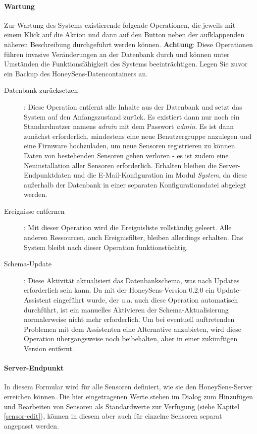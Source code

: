 \documentclass[12pt]{article}
\begin{document}
\paragraph{Wartung}
Zur Wartung des Systems existierende folgende Operationen, die jeweils mit einem Klick auf die Aktion und dann auf den Button neben der aufklappenden näheren Beschreibung durchgeführt werden können. \textbf{Achtung}: Diese Operationen führen invasive Veränderungen an der Datenbank durch und können unter Umständen die Funktionsfähigkeit des Systems beeinträchtigen. Legen Sie zuvor ein Backup des HoneySens-Datencontainers an.

\begin{description}
				\item[Datenbank zurücksetzen]: Diese Operation entfernt alle Inhalte aus der Datenbank und setzt das System auf den Anfangszustand zurück. Es existiert dann nur noch ein Standardnutzer namens \textit{admin} mit dem Passwort \textit{admin}. Es ist dann zunächst erforderlich, mindestens eine neue Benutzergruppe anzulegen und eine Firmware hochzuladen, um neue Sensoren registrieren zu können. Daten von bestehenden Sensoren gehen verloren - es ist zudem eine Neuinstallation aller Sensoren erforderlich. Erhalten bleiben die Server-Endpunktdaten und die E-Mail-Konfiguration im Modul \textit{System}, da diese außerhalb der Datenbank in einer separaten Konfigurationsdatei abgelegt werden.
				\item[Ereignisse entfernen]: Mit dieser Operation wird die Ereignisliste vollständig geleert. Alle anderen Ressourcen, auch Ereignisfilter, bleiben allerdings erhalten. Das System bleibt nach dieser Operation funktionstüchtig.
				\item[Schema-Update]: Diese Aktivität aktualisiert das Datenbankschema, was nach Updates erforderlich sein kann. Da mit der HoneySens-Version 0.2.0 ein Update-Assistent eingeführt wurde, der u.a. auch diese Operation automatisch durchführt, ist ein manuelles Aktivieren der Schema-Aktualisierung normalerweise nicht mehr erforderlich. Um bei eventuell auftretenden Problemen mit dem Assistenten eine Alternative anzubieten, wird diese Operation übergangsweise noch beibehalten, aber in einer zukünftigen Version entfernt.
\end{description}

\paragraph{Server-Endpunkt}
In diesem Formular wird für alle Sensoren definiert, wie sie den HoneySens-Server erreichen können. Die hier eingetragenen Werte stehen im Dialog zum Hinzufügen und Bearbeiten von Sensoren als Standardwerte zur Verfügung (siehe Kapitel \ref{sensor-edit}), können in diesem aber auch für einzelne Sensoren separat angepasst werden.
\end{document}
